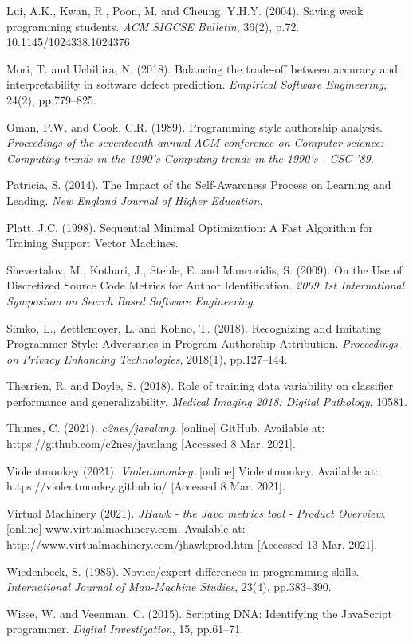 \documentclass{report}
\begin{document}
Lui, A.K., Kwan, R., Poon, M. and Cheung, Y.H.Y. (2004). Saving weak programming students. \textit{ACM SIGCSE Bulletin}, 36(2), p.72.‌ 10.1145/1024338.1024376

Mori, T. and Uchihira, N. (2018). Balancing the trade-off between accuracy and interpretability in software defect prediction. \textit{Empirical Software Engineering}, 24(2), pp.779–825.

Oman, P.W. and Cook, C.R. (1989). Programming style authorship analysis. \textit{Proceedings of the seventeenth annual ACM conference on Computer science: Computing trends in the 1990’s Computing trends in the 1990’s - CSC ’89}.

Patricia, S. (2014). The Impact of the Self-Awareness Process on Learning and Leading. \textit{New England Journal of Higher Education}.

Platt, J.C. (1998). Sequential Minimal Optimization: A Fast Algorithm for Training Support Vector Machines.

Shevertalov, M., Kothari, J., Stehle, E. and Mancoridis, S. (2009). On the Use of Discretized Source Code Metrics for Author Identification. \textit{2009 1st International Symposium on Search Based Software Engineering}.

Simko, L., Zettlemoyer, L. and Kohno, T. (2018). Recognizing and Imitating Programmer Style: Adversaries in Program Authorship Attribution. \textit{Proceedings on Privacy Enhancing Technologies}, 2018(1), pp.127–144.

Therrien, R. and Doyle, S. (2018). Role of training data variability on classifier performance and generalizability. \textit{Medical Imaging 2018: Digital Pathology}, 10581.

Thunes, C. (2021). \textit{c2nes/javalang}. [online] GitHub. Available at: https://github.com/c2nes/javalang [Accessed 8 Mar. 2021].

Violentmonkey (2021). \textit{Violentmonkey}. [online] Violentmonkey. Available at: https://violentmonkey.github.io/ [Accessed 8 Mar. 2021].

Virtual Machinery (2021). \textit{JHawk - the Java metrics tool - Product Overview}. [online] www.virtualmachinery.com. Available at: http://www.virtualmachinery.com/jhawkprod.htm [Accessed 13 Mar. 2021].

Wiedenbeck, S. (1985). Novice/expert differences in programming skills. \textit{International Journal of Man-Machine Studies}, 23(4), pp.383–390.

Wisse, W. and Veenman, C. (2015). Scripting DNA: Identifying the JavaScript programmer. \textit{Digital Investigation}, 15, pp.61–71.
\end{document}
